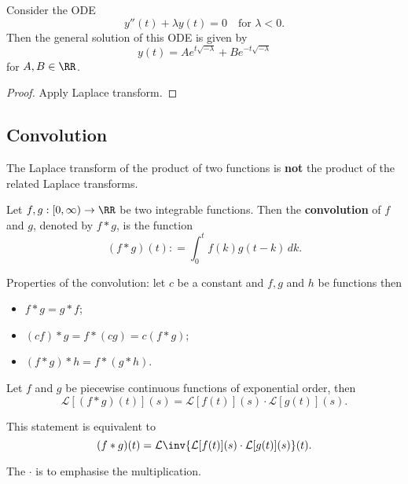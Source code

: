 \documentclass[12pt, a4paper]{article}
\newcommand{\CL}{\mathcal{L}}
\begin{document}
\begin{mdprop}
    Consider the ODE
    \[y''(t) + \lambda y(t)=0 \quad \text{for } \lambda<0.\]
    Then the general solution of this ODE is given by 
    \[y(t) = Ae^{t\sqrt{-\lambda}}+Be^{-t\sqrt{-\lambda}}\]
    for \(A,B \in \RR\).
\end{mdprop}

\begin{proof}
    Apply Laplace transform.
\end{proof}

\subsection{Convolution}

\begin{mdnote}
    The Laplace transform of the product of two functions is \textbf{not} the product of the related Laplace transforms.
\end{mdnote}

\begin{definition}
    Let \(f,g : [0,\infty) \to \RR\) be two integrable functions. Then the \textbf{convolution} of \(f\) and \(g\), denoted by \(f*g\), is the function 
    \[(f*g)(t) : = \int_{0}^{t} f(k)g(t-k) \, dk.\]
\end{definition}

\begin{theorem}
    Properties of the convolution: let \(c\) be a constant and \(f,g\) and \(h\) be functions then
    \begin{itemize}
        \item \(f*g=g*f\);
        \item \((cf)*g=f*(cg)=c(f*g)\);
        \item \((f*g)*h=f*(g*h)\).
    \end{itemize}
\end{theorem}

\begin{mdthm}
    Let \(f\) and \(g\) be piecewise continuous functions of exponential order, then 
    \[\CL[(f*g)(t)](s) = \CL[f(t)](s) \cdot \CL[g(t)](s).\]
\end{mdthm}

\begin{mdremark}
    This statement is equivalent to 
    \[(f*g)(t) = \CL\inv\{\CL[f(t)](s) \cdot \CL[g(t)](s)\}(t).\]
\end{mdremark}

\begin{mdnote}
    The \(\cdot\) is to emphasise the multiplication.
\end{mdnote}
\end{document}
